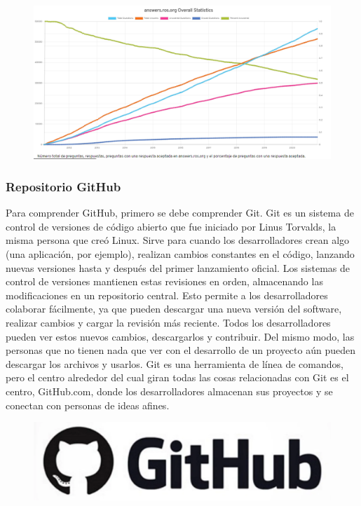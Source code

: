         \begin{figure}[htb]
            \centering
            \includegraphics[width=0.92\linewidth]{Main/Chapter3/Images3/cap3_estadisticas_6.png}
            \caption{}
            \label{f:Cap3-5_estadisticas_7}
        \end{figure}  

        \newpage

        
        \subsubsection{Repositorio GitHub}
            Para comprender GitHub, primero se debe comprender Git. Git es un sistema de control de versiones de código abierto que fue iniciado por Linus Torvalds, la misma persona que creó Linux. Sirve para cuando los desarrolladores crean algo (una aplicación, por ejemplo), realizan cambios constantes en el código, lanzando nuevas versiones hasta y después del primer lanzamiento oficial. Los sistemas de control de versiones mantienen estas revisiones en orden, almacenando las modificaciones en un repositorio central. Esto permite a los desarrolladores colaborar fácilmente, ya que pueden descargar una nueva versión del software, realizar cambios y cargar la revisión más reciente. Todos los desarrolladores pueden ver estos nuevos cambios, descargarlos y contribuir. Del mismo modo, las personas que no tienen nada que ver con el desarrollo de un proyecto aún pueden descargar los archivos y usarlos. Git es una herramienta de línea de comandos, pero el centro alrededor del cual giran todas las cosas relacionadas con Git es el centro, GitHub.com, donde los desarrolladores almacenan sus proyectos y se conectan con personas de ideas afines.
    
            \begin{figure}[htb]
            \centering
            \includegraphics[width=0.2\linewidth]{Main/Chapter3/Images3/repo_git_1.png}
            \caption{}
            \label{f:Cap3-5_estadisticas_8}
            \end{figure} 
        
